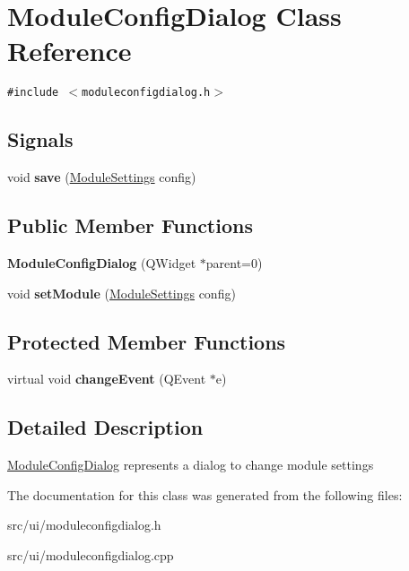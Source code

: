 \hypertarget{classModuleConfigDialog}{
\section{ModuleConfigDialog Class Reference}
\label{classModuleConfigDialog}
}
{\tt \#include $<$moduleconfigdialog.h$>$}

\subsection*{Signals}
\begin{CompactItemize}
\item 
\hypertarget{classModuleConfigDialog_84f3addff3fdb1f9ceac5efad6a21c37}{
void \textbf{save} (\hyperlink{classModuleSettings}{ModuleSettings} config)}
\label{classModuleConfigDialog_84f3addff3fdb1f9ceac5efad6a21c37}

\end{CompactItemize}
\subsection*{Public Member Functions}
\begin{CompactItemize}
\item 
\hypertarget{classModuleConfigDialog_eb291f87e7e3749701299118e521ddc0}{
\textbf{ModuleConfigDialog} (QWidget $\ast$parent=0)}
\label{classModuleConfigDialog_eb291f87e7e3749701299118e521ddc0}

\item 
\hypertarget{classModuleConfigDialog_a66110dc25bdd33d6b5960b87e15beb1}{
void \textbf{setModule} (\hyperlink{classModuleSettings}{ModuleSettings} config)}
\label{classModuleConfigDialog_a66110dc25bdd33d6b5960b87e15beb1}

\end{CompactItemize}
\subsection*{Protected Member Functions}
\begin{CompactItemize}
\item 
\hypertarget{classModuleConfigDialog_0eeda84ed46ffc60b77183542eb4f583}{
virtual void \textbf{changeEvent} (QEvent $\ast$e)}
\label{classModuleConfigDialog_0eeda84ed46ffc60b77183542eb4f583}

\end{CompactItemize}


\subsection{Detailed Description}
\hyperlink{classModuleConfigDialog}{ModuleConfigDialog} represents a dialog to change module settings 

The documentation for this class was generated from the following files:\begin{CompactItemize}
\item 
src/ui/moduleconfigdialog.h\item 
src/ui/moduleconfigdialog.cpp\end{CompactItemize}
